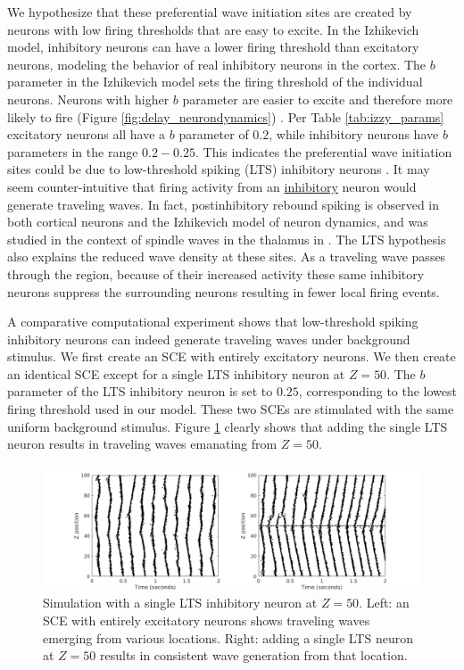 \documentclass[12pt]{article}
\begin{document}
We hypothesize that these preferential wave initiation sites are created by neurons with low firing thresholds that are easy to excite.
In the Izhikevich model, inhibitory neurons can have a lower firing threshold than excitatory neurons, modeling the behavior of real inhibitory neurons in the cortex\parencite{gibson2009}\parencite{hayut2011}.
The $b$ parameter in the Izhikevich model sets the firing threshold of the individual neurons.
Neurons with higher $b$ parameter are easier to excite and therefore more likely to fire \color{red}(Figure \ref{fig:delay_neurondynamics}) \color{black}.
Per Table \ref{tab:izzy_params} excitatory neurons all have a $b$ parameter of $0.2$, while inhibitory neurons have $b$ parameters in the range $0.2-0.25$.
This indicates the preferential wave initiation sites could be due to low-threshold spiking (LTS) inhibitory neurons \parencite{izhikevich2003}.
It may seem counter-intuitive that firing activity from an \underline{inhibitory} neuron would generate traveling waves.
In fact, postinhibitory rebound spiking is observed in both cortical neurons \parencite{ascoli2010} and the Izhikevich model of neuron dynamics, \color{red} and was studied in the context of spindle waves in the thalamus in \parencite{Golomb1996}\color{black}.
The LTS hypothesis also explains the reduced wave density at these sites.
As a traveling wave passes through the region, because of their increased activity these same inhibitory neurons suppress the surrounding neurons resulting in fewer local firing events.

A comparative computational experiment shows that low-threshold spiking inhibitory neurons can indeed generate traveling waves under background stimulus.
We first create an SCE with entirely excitatory neurons.
We then create an identical SCE except for a single LTS inhibitory neuron at $Z=50$.
The $b$ parameter of the LTS inhibitory neuron is set to $0.25$, corresponding to the lowest firing threshold used in our model.
These two SCEs are stimulated with the same uniform background stimulus. 
Figure \ref{fig:lts_inhibit} clearly shows that adding the single LTS neuron results in traveling waves emanating from $Z=50$. 
\begin{figure}[!htb]
 \caption{Simulation with a single LTS inhibitory neuron at $Z=50$. Left: an SCE with entirely excitatory neurons shows traveling waves emerging from various locations. Right: adding a single LTS neuron at $Z=50$ results in consistent wave generation from that location. }
 \label{fig:lts_inhibit}
 \centering
   \includegraphics[width=\textwidth]{fig/SingleLTSInhibit}
\end{figure}
\end{document}
